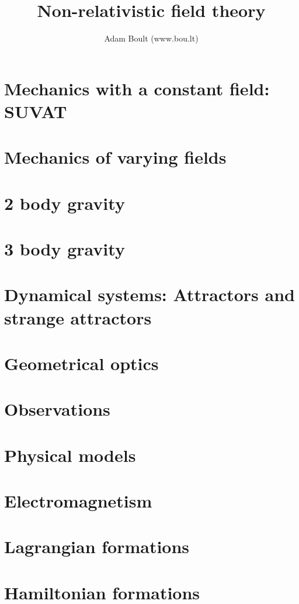 \documentclass[oneside]{book}
\begin{document}
\author{Adam Boult (www.bou.lt)}
\title{Non-relativistic field theory}
\maketitle

\setcounter{tocdepth}{0}
\tableofcontents



\part{Mechanics with a constant field: SUVAT}


\part{Mechanics of varying fields}




\part{2 body gravity}

\part{3 body gravity}

\part{Dynamical systems: Attractors and strange attractors}

\part{Geometrical optics}

\part{Observations}

\part{Physical models}






\part{Electromagnetism}


\part{Lagrangian formations}

\part{Hamiltonian formations}

\end{document}
